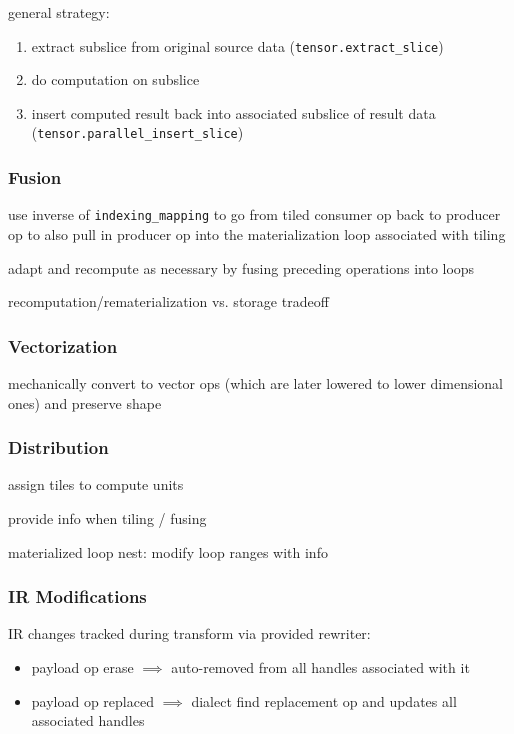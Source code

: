 \documentclass[8pt]{extarticle}
\begin{document}
\begin{multicols*}{2}
general strategy:
\begin{enumerate}
\item extract subslice from original source data (\verb|tensor.extract_slice|)
\item do computation on subslice
\item insert computed result back into associated subslice of result data (\verb|tensor.parallel_insert_slice|)
\end{enumerate}

\subsubsection{Fusion}
use inverse of \verb|indexing_mapping| to go from tiled consumer op back to producer op to also pull in producer op into the materialization loop associated with tiling

adapt and recompute as necessary by fusing preceding operations into loops

recomputation/rematerialization vs. storage tradeoff

\subsubsection{Vectorization}
mechanically convert to vector ops (which are later lowered to lower dimensional ones) and preserve shape

\subsubsection{Distribution}

assign tiles to compute units

provide info when tiling / fusing

materialized loop nest: modify loop ranges with info

\subsubsection{IR Modifications}

IR changes tracked during transform via provided rewriter:
\begin{itemize}
\item payload op erase $\implies$ auto-removed from all handles associated with it
\item payload op replaced $\implies$ dialect find replacement op and updates all associated handles
\end{itemize}


\end{multicols*}
\end{document}
